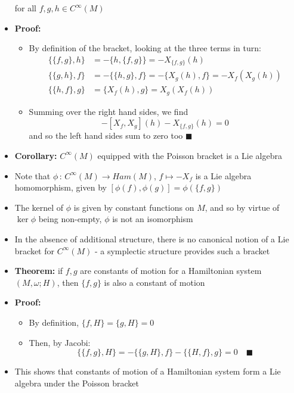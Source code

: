 \documentclass[12pt,a4paper]{article}
\numberwithin{equation}{section}
\begin{document}
\begin{itemize}
		for all $f,g,h\in C^{\infty}(M)$
		\item \textbf{Proof:}
		\begin{itemize}
			\item By definition of the bracket, looking at the three terms in turn:
			\begin{equation}
				\begin{aligned}
					\{\{f,g\},h\}&=-\{h,\{f,g\}\}=-X_{\{f,g\}}(h)\\
					\{\{g,h\},f\}&=-\{\{h,g\},f\}=-\{X_{g}(h),f\}=-X_{f}(X_{g}(h))\\
					\{\{h,f\},g\}&=\{X_{f}(h),g\}=X_{g}(X_{f}(h))
				\end{aligned}
			\end{equation}
			\item Summing over the right hand sides, we find
			\begin{equation}
				-[X_{f},X_{g}](h)-X_{\{f,g\}}(h)=0
			\end{equation}
			and so the left hand sides sum to zero too $\blacksquare$
		\end{itemize}
		\item \textbf{Corollary:} $C^{\infty}(M)$ equipped with the Poisson bracket is a Lie algebra
		\item Note that $\phi\,:\,C^{\infty}(M)\to Ham(M)$, $f\mapsto -X_{f}$ is a Lie algebra homomorphism, given by $[\phi(f),\phi(g)]=\phi(\{f,g\})$
		\item The kernel of $\phi$ is given by constant functions on $M$, and so by virtue of $\ker{\phi}$ being non-empty, $\phi$ is not an isomorphism
		\item In the absence of additional structure, there is no canonical notion of a Lie bracket for $C^{\infty}(M)$ - a symplectic structure provides such a bracket
		\item \textbf{Theorem:} if $f,g$ are constants of motion for a Hamiltonian system $(M,\omega;H)$, then $\{f,g\}$ is also a constant of motion
		\item \textbf{Proof:}
		\begin{itemize}
			\item By definition, $\{f,H\}=\{g,H\}=0$
			\item Then, by Jacobi:
			\begin{equation}
				\{\{f,g\},H\}=-\{\{g,H\},f\}-\{\{H,f\},g\}=0\quad \blacksquare
			\end{equation}
		\end{itemize}
		\item This shows that constants of motion of a Hamiltonian system form a Lie algebra under the Poisson bracket

\end{itemize}
\end{document}
